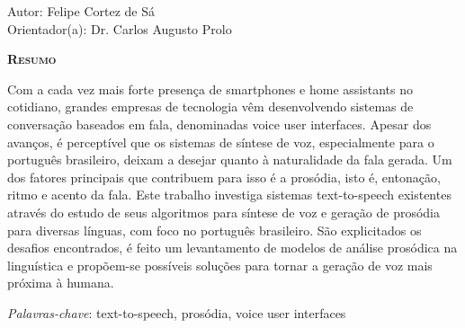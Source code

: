 \begin{center}
	{\Large{\textbf{\tccTitle}}}
\end{center}

\vspace{1cm}

\begin{flushright}
	Autor: Felipe Cortez de Sá \\
	Orientador(a): Dr. Carlos Augusto Prolo
\end{flushright}

\vspace{1cm}

\begin{center}
	\Large{\textsc{\textbf{Resumo}}}
\end{center}

\noindent Com a cada vez mais forte presença de smartphones e home assistants no
cotidiano, grandes empresas de tecnologia vêm desenvolvendo sistemas de
conversação baseados em fala, denominadas voice user interfaces. Apesar dos avanços, é perceptível que os sistemas de síntese de voz, especialmente para o português brasileiro, deixam a desejar quanto à naturalidade da fala gerada. Um dos fatores principais que contribuem para isso é a prosódia, isto é, entonação, ritmo e acento da fala. Este trabalho investiga sistemas text-to-speech existentes através do estudo de seus algoritmos para síntese de voz e geração de prosódia para diversas línguas, com foco no português brasileiro. São explicitados os desafios encontrados, é feito um levantamento de modelos de análise prosódica na linguística e propõem-se possíveis soluções para tornar a geração de voz mais próxima à humana.

\noindent\textit{Palavras-chave}: text-to-speech, prosódia, voice user interfaces
